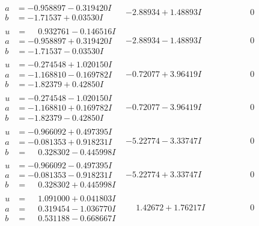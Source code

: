 \documentclass[1p]{elsarticle_modified}
\theoremstyle{definition}
\begin{document}
$$\begin{array}{c|c|c}
\begin{aligned}
a &= -0.958897 - 0.319420 I \\
b &= -1.71537 + 0.03530 I\end{aligned}
 & -2.88934 + 1.48893 I & \phantom{-0.000000 } 0 \\ \hline\begin{aligned}
u &= \phantom{-}0.932761 - 0.146516 I \\
a &= -0.958897 + 0.319420 I \\
b &= -1.71537 - 0.03530 I\end{aligned}
 & -2.88934 - 1.48893 I & \phantom{-0.000000 } 0 \\ \hline\begin{aligned}
u &= -0.274548 + 1.020150 I \\
a &= -1.168810 - 0.169782 I \\
b &= -1.82379 + 0.42850 I\end{aligned}
 & -0.72077 + 3.96419 I & \phantom{-0.000000 } 0 \\ \hline\begin{aligned}
u &= -0.274548 - 1.020150 I \\
a &= -1.168810 + 0.169782 I \\
b &= -1.82379 - 0.42850 I\end{aligned}
 & -0.72077 - 3.96419 I & \phantom{-0.000000 } 0 \\ \hline\begin{aligned}
u &= -0.966092 + 0.497395 I \\
a &= -0.081353 + 0.918231 I \\
b &= \phantom{-}0.328302 - 0.445998 I\end{aligned}
 & -5.22774 - 3.33747 I & \phantom{-0.000000 } 0 \\ \hline\begin{aligned}
u &= -0.966092 - 0.497395 I \\
a &= -0.081353 - 0.918231 I \\
b &= \phantom{-}0.328302 + 0.445998 I\end{aligned}
 & -5.22774 + 3.33747 I & \phantom{-0.000000 } 0 \\ \hline\begin{aligned}
u &= \phantom{-}1.091000 + 0.041803 I \\
a &= \phantom{-}0.319454 - 1.036770 I \\
b &= \phantom{-}0.531188 - 0.668667 I\end{aligned}
 & \phantom{-}1.42672 + 1.76217 I & \phantom{-0.000000 } 0 \\ \hline\begin{aligned}

\end{aligned}
\end{array}$$
\end{document}
